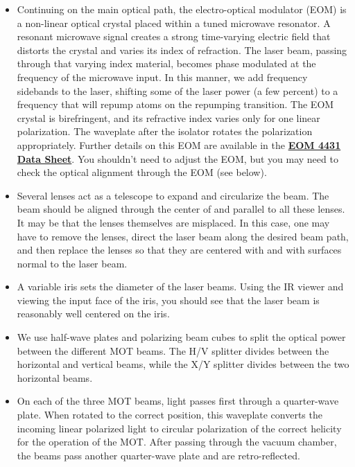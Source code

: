 \documentclass{../lab}
\begin{document}
\begin{itemize}
    \item Continuing on the main optical path, the electro-optical modulator (EOM) is a non-linear optical crystal placed within a tuned microwave resonator. A resonant microwave signal creates a strong time-varying electric field that distorts the crystal and varies its index of refraction. The laser beam, passing through that varying index material, becomes phase modulated at the frequency of the microwave input. In this manner, we add frequency sidebands to the laser, shifting some of the laser power (a few percent) to a frequency that will repump atoms on the repumping transition. The EOM crystal is birefringent, and its refractive index varies only for one linear polarization. The waveplate after the isolator rotates the polarization appropriately. Further details on this EOM are available in the \href{http://physics111.lib.berkeley.edu/Physics111/Reprints/MOT/Modulators.pdf}{\textbf{EOM 4431 Data Sheet}}.  You shouldn't need to adjust the EOM, but you may need to check the optical alignment through the EOM (see below).

    \item Several lenses act as a telescope to expand and circularize the beam. The beam should be aligned through the center of and parallel to all these lenses.  It may be that the lenses themselves are misplaced.  In this case, one may have to remove the lenses, direct the laser beam along the desired beam path, and then replace the lenses so that they are centered with and with surfaces normal to the laser beam.

    \item A variable iris sets the diameter of the laser beams. Using the IR viewer and viewing the input face of the iris, you should see that the laser beam is reasonably well centered on the iris.

    \item We use half-wave plates and polarizing beam cubes to split the optical power between the different MOT beams. The H/V splitter divides between the horizontal and vertical beams, while the X/Y splitter divides between the two horizontal beams.

    \item On each of the three MOT beams, light passes first through a quarter-wave plate. When rotated to the correct position, this waveplate converts the incoming linear polarized light to circular polarization of the correct helicity for the operation of the MOT. After passing through the vacuum chamber, the beams pass another quarter-wave plate and are retro-reflected.


\end{itemize}
\end{document}
